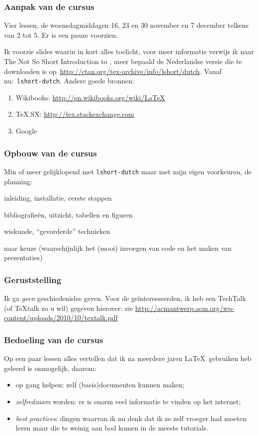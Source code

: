 \begin{frame}
  \frametitle{Aanpak van de cursus}

  Vier lessen, de woensdagmiddagen 16, 23 en 30 november en 7 december telkens van 2 tot 5. Er is een pauze voorzien.

  Ik voorzie slides waarin in kort alles toelicht, voor meer informatie verwijs ik naar The Not So Short Introduction to \LaTeXe, meer bepaald de Nederlandse versie die te downloaden is op~\url{http://ctan.org/tex-archive/info/lshort/dutch}. Vanaf nu:~\texttt{lshort-dutch}. Andere goede bronnen:
  \begin{enumerate}
    \item Wikibooks: \url{http://en.wikibooks.org/wiki/LaTeX}
    \item TeX.SX: \url{http://tex.stackexchange.com}
    \item Google
  \end{enumerate}
\end{frame}

\begin{frame}
  \frametitle{Opbouw van de cursus}

  Min of meer gelijklopend met \texttt{lshort-dutch} maar met mijn eigen voorkeuren, de planning:

  \begin{description}
    \item[eerste week] inleiding, installatie, eerste stappen
    \item[tweede week] bibliografie\"en, uitzicht, tabellen en figuren
    \item[derde week] wiskunde, ``gevorderde'' technieken
    \item[vierde week] naar keuze (waarschijnlijk het (mooi) invoegen van code en het maken van presentaties)
  \end{description}
\end{frame}

\begin{frame}
  \frametitle{Geruststelling}

  Ik ga \emph{geen} geschiedenisles geven. Voor de ge\"interesseerden, ik heb een TechTalk (of \TeX talk zo u wil) gegeven hierover: zie \url{http://acmantwerp.acm.org/wp-content/uploads/2010/10/textalk.pdf}
\end{frame}

\begin{frame}
  \frametitle{Bedoeling van de cursus}

  Op een paar lessen alles vertellen dat ik na meerdere jaren \LaTeX\ gebruiken heb geleerd is onmogelijk, daarom:
  \begin{itemize}
    \item op gang helpen: zelf (basis)documenten kunnen maken;
    \item \emph{zelfredzaam} worden: er is enorm veel informatie te vinden op het internet;
    \item \emph{best practices}: dingen waarvan ik nu denk dat ik ze zelf vroeger had moeten leren maar die te weinig aan bod komen in de meeste tutorials.
  \end{itemize}
\end{frame}

